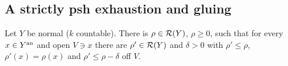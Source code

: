 \subsection{A strictly psh exhaustion and gluing}\label{subsec:gluing}

\begin{lemma}\label{lem:strict-exhaustion}
\leanok
{}
Let $Y$ be normal ($k$ countable). There is $\rho\in\mathcal{R}(Y)$, $\rho\ge0$, such that for every
$x\in Y^{\mathrm{an}}$ and open $V\ni x$ there are $\rho'\in\mathcal{R}(Y)$ and $\delta>0$ with $\rho'\le\rho$,
$\rho'(x)=\rho(x)$ and $\rho'\le\rho-\delta$ off $V$.
\end{lemma}

